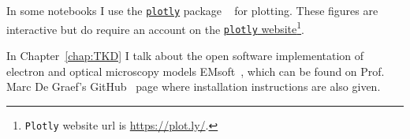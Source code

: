 In some notebooks I use the \href{https://plot.ly/}{\texttt{plotly}} package ~\cite{Plotly} for plotting. These figures are interactive but do require an account on the \href{https://plot.ly/}{\texttt{plotly} website}\footnote{ \texttt{Plotly} website url is \href{https://plot.ly/}{https://plot.ly/}.}.  

In Chapter~\ref{chap:TKD} I talk about the open software implementation of electron and optical microscopy models EMsoft~\cite{EMsoftpaper}, which can be found on Prof. Marc De Graef's GitHub~\cite{EMsoft} page where installation instructions are also given.